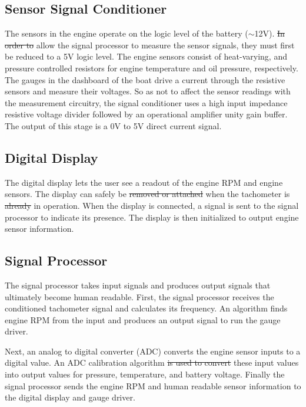 \documentclass[11pt]{article}
\providecommand{\DIFaddtex}[1]{{\protect\color{blue}\uwave{#1}}} %
\providecommand{\DIFdeltex}[1]{{\protect\color{red}\sout{#1}}}                      %
\providecommand{\DIFaddbegin}{} %
\providecommand{\DIFaddend}{} %
\providecommand{\DIFdelbegin}{} %
\providecommand{\DIFdelend}{} %
\providecommand{\DIFadd}[1]{\texorpdfstring{\DIFaddtex{#1}}{#1}} %
\providecommand{\DIFdel}[1]{\texorpdfstring{\DIFdeltex{#1}}{}} %
\newcommand{\DIFscaledelfig}{0.5}
\newlength{\DIFdelgraphicswidth} %
\newlength{\DIFdelgraphicsheight} %
\newcommand{\DIFaddincludegraphics}[2][]{{\color{blue}\fbox{\DIFOincludegraphics[#1]{#2}}}} %
\newcommand{\DIFdelincludegraphics}[2][]{%
\sbox{\DIFdelgraphicsbox}{\DIFOincludegraphics[#1]{#2}}%
\settoboxwidth{\DIFdelgraphicswidth}{\DIFdelgraphicsbox} %
\settoboxtotalheight{\DIFdelgraphicsheight}{\DIFdelgraphicsbox} %
\scalebox{\DIFscaledelfig}{%
\parbox[b]{\DIFdelgraphicswidth}{\usebox{\DIFdelgraphicsbox}\\[-\baselineskip] \rule{\DIFdelgraphicswidth}{0em}}\llap{\resizebox{\DIFdelgraphicswidth}{\DIFdelgraphicsheight}{%
\setlength{\unitlength}{\DIFdelgraphicswidth}%
\begin{picture}(1,1)%
\thicklines\linethickness{2pt} %
{\color[rgb]{1,0,0}\put(0,0){\framebox(1,1){}}}%
{\color[rgb]{1,0,0}\put(0,0){\line( 1,1){1}}}%
{\color[rgb]{1,0,0}\put(0,1){\line(1,-1){1}}}%
\end{picture}%
}\hspace*{3pt}}} %
} %
\DeclareRobustCommand{\DIFaddbegin}{\DIFOaddbegin \let\includegraphics\DIFaddincludegraphics} %
\DeclareRobustCommand{\DIFaddend}{\DIFOaddend \let\includegraphics\DIFOincludegraphics} %
\DeclareRobustCommand{\DIFdelbegin}{\DIFOdelbegin \let\includegraphics\DIFdelincludegraphics} %
\DeclareRobustCommand{\DIFdelend}{\DIFOaddend \let\includegraphics\DIFOincludegraphics} %
\begin{document}
\subsection{Sensor Signal Conditioner}

The sensors in the engine operate on the logic level of the battery ($\sim$12V). \DIFdelbegin \DIFdel{In order to }\DIFdelend \DIFaddbegin \DIFadd{To }\DIFaddend allow the signal processor to measure the sensor signals, they must first be reduced to a 5V logic level. The engine sensors consist of heat-varying, and pressure controlled resistors for engine temperature and oil pressure, respectively. The gauges in the dashboard of the boat drive a current through the resistive sensors and measure their voltages. So as not to affect the sensor readings with the measurement circuitry, the signal conditioner uses a high input impedance resistive voltage divider followed by an operational amplifier unity gain buffer. The output of this stage is a 0V to 5V direct current signal.

\subsection{Digital Display}

The digital display lets the user see a readout of the engine RPM and engine sensors. The display can safely be \DIFdelbegin \DIFdel{removed or attached }\DIFdelend \DIFaddbegin \DIFadd{hot swapped }\DIFaddend when the tachometer is \DIFdelbegin \DIFdel{already }\DIFdelend in operation. When the display is connected, a signal is sent to the signal processor to indicate its presence. The display is then initialized to output engine sensor information.

\subsection{Signal Processor}
The signal processor takes input signals and produces output signals that ultimately become human readable. First, the signal processor receives the conditioned tachometer signal and calculates its frequency. An algorithm finds engine RPM from the input and produces an output signal to run the gauge driver.

Next, an analog to digital converter (ADC) converts the engine sensor inputs to a digital value. An ADC calibration algorithm \DIFdelbegin \DIFdel{is used to convert }\DIFdelend \DIFaddbegin \DIFadd{converts }\DIFaddend these input values into output values for pressure, temperature, and battery voltage. Finally the signal processor sends the engine RPM and human readable sensor information to the digital display and gauge driver.
\end{document}
